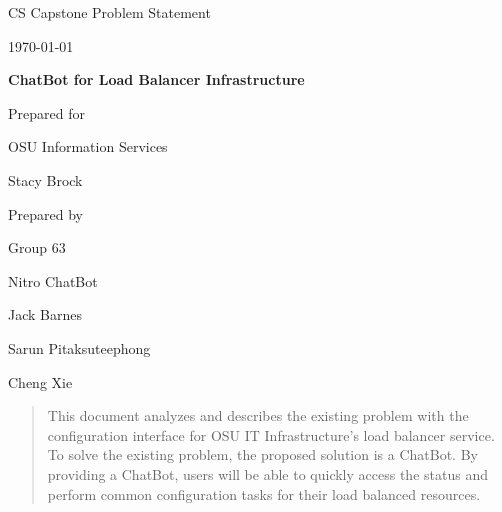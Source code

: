 \documentclass[onecolumn, draftclsnofoot,10pt, compsoc]{IEEEtran}
\def \CapstoneTeamName{		    Nitro ChatBot}
\def \CapstoneTeamNumber{		63}
\def \GroupMemberOne{			Jack Barnes}
\def \GroupMemberTwo{			Sarun Pitaksuteephong}
\def \GroupMemberThree{			Cheng Xie}
\def \CapstoneProjectName{		ChatBot for Load Balancer Infrastructure}
\def \CapstoneSponsorCompany{	OSU Information Services}
\def \CapstoneSponsorPerson{	Stacy Brock}
\def \DocType{		Problem Statement
				}
\newcommand{\NameSigPair}[1]{\par
\makebox[2.75in][r]{#1} \hfil 	\makebox[3.25in]{\makebox[2.25in]{\hrulefill} \hfill		\makebox[.75in]{\hrulefill}}
\par\vspace{-12pt} \textit{\tiny\noindent
\makebox[2.75in]{} \hfil		\makebox[3.25in]{\makebox[2.25in][r]{Signature} \hfill	\makebox[.75in][r]{Date}}}}
\renewcommand{\NameSigPair}[1]{#1}
\begin{document}
\begin{titlepage}
    \begin{singlespace}
        \hfill 
        \par\vspace{.2in}
        \centering
        \scshape{
            \huge CS Capstone \DocType \par
            {\large\today}\par
            \vspace{.5in}
            \textbf{\Huge\CapstoneProjectName}\par
            \vfill
            {\large Prepared for}\par
            \Huge \CapstoneSponsorCompany\par
            \vspace{5pt}
            {\Large\NameSigPair{\CapstoneSponsorPerson}\par}
            {\large Prepared by }\par
            Group\CapstoneTeamNumber\par
            \CapstoneTeamName\par 
            \vspace{5pt}
            {\Large
                \NameSigPair{\GroupMemberOne}\par
                \NameSigPair{\GroupMemberTwo}\par
                \NameSigPair{\GroupMemberThree}\par
            }
            \vspace{20pt}
        }
        \begin{abstract}
        	This document analyzes and describes the existing problem with the configuration interface for OSU IT Infrastructure's load balancer service.
        	To solve the existing problem, the proposed solution is a ChatBot.
        	By providing a ChatBot, users will be able to quickly access the status and perform common configuration tasks for their load balanced resources.
        \end{abstract}     
    \end{singlespace}
\end{titlepage}
\newpage
{}
\clearpage
\end{document}
